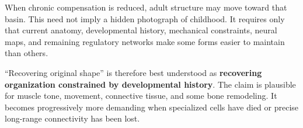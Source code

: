 When chronic compensation is reduced, adult structure may move toward that basin. This need not imply a hidden photograph of childhood. It requires only that current anatomy, developmental history, mechanical constraints, neural maps, and remaining regulatory networks make some forms easier to maintain than others.

``Recovering original shape'' is therefore best understood as \textbf{recovering organization constrained by developmental history}. The claim is plausible for muscle tone, movement, connective tissue, and some bone remodeling. It becomes progressively more demanding when specialized cells have died or precise long-range connectivity has been lost.
